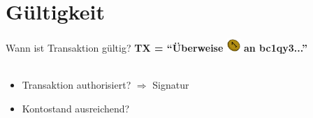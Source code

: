 \documentclass[aspectratio=169]{beamer}
\begin{document}
\section{Gültigkeit}

\begin{frame}{Wann ist Transaktion gültig?}
    \textbf{TX = ``Überweise \includegraphics[width=0.5cm]{../icons/Coin} an bc1qy3...''}\\~\\
    \begin{itemize}
        \item Transaktion authorisiert? $\Rightarrow$ Signatur \textcolor{mydarkgreen}{\Large\checkmark}
        \item Kontostand ausreichend?
    \end{itemize}
\end{frame}
\end{document}
